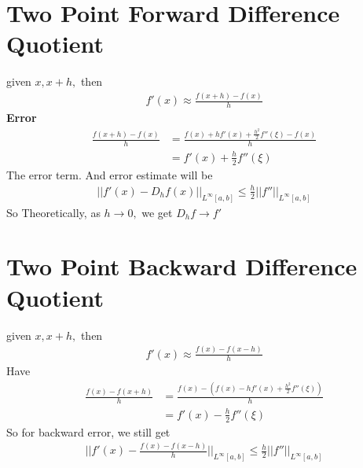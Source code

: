 \documentclass[11pt,oneside]{book}
\theoremstyle{break}
\theoremstyle{break}
\begin{document}
\section[Two Point Forward Difference Quotient]{Two Point Forward Difference Quotient}
given $x,x+h,$ then \begin{align*}
f'(x)\approx \frac{f(x+h)-f(x)}{h}
\end{align*}
\textbf{Error}\begin{align*}
\frac{f(x+h)-f(x)}{h}&=\frac{f(x)+hf'(x)+\frac{h^2}{2}f''(\xi)-f(x)}{h}\\
&=f'(x)+\frac{h}{2}f''(\xi)
\end{align*}
The error term. And error estimate will be \begin{align*}
||f'(x)-D_hf(x)||_{L^{\infty}[a,b]}\leq \frac{h}{2}||f''||_{L^{\infty}[a,b]}
\end{align*}
So Theoretically, as $h\to 0,$ we get $D_hf\to f'$\\
\section[Two Point Backward Difference Quotient]{Two Point Backward Difference Quotient}
given $x,x+h,$ then \begin{align*}
f'(x)\approx \frac{f(x)-f(x-h)}{h}
\end{align*}
Have \begin{align*}
\frac{f(x)-f(x+h)}{h}&=\frac{f(x)-(f(x)-hf'(x)+\frac{h^2}{2}f''(\xi))}{h}\\
&=f'(x)-\frac{h}{2}f''(\xi)
\end{align*}
So for backward error, we still get\begin{align*}
||f'(x)-\frac{f(x)-f(x-h)}{h}||_{L^{\infty}[a,b]}\leq \frac{h}{2}||f''||_{L^{\infty}[a,b]}
\end{align*}
\end{document}
